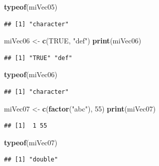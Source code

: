 \documentclass[]{book}
\newenvironment{Shaded}{\begin{snugshade}}{\end{snugshade}}
\newcommand{\KeywordTok}[1]{\textcolor[rgb]{0.13,0.29,0.53}{\textbf{#1}}}
\newcommand{\DecValTok}[1]{\textcolor[rgb]{0.00,0.00,0.81}{#1}}
\newcommand{\StringTok}[1]{\textcolor[rgb]{0.31,0.60,0.02}{#1}}
\newcommand{\OtherTok}[1]{\textcolor[rgb]{0.56,0.35,0.01}{#1}}
\newcommand{\NormalTok}[1]{#1}
\begin{document}
\begin{Shaded}
\begin{Highlighting}[]
\KeywordTok{typeof}\NormalTok{(miVec05)}
\end{Highlighting}
\end{Shaded}

\begin{verbatim}
## [1] "character"
\end{verbatim}

\begin{Shaded}
\begin{Highlighting}[]
\NormalTok{miVec06 <-}\StringTok{ }\KeywordTok{c}\NormalTok{(}\OtherTok{TRUE}\NormalTok{, }\StringTok{"def"}\NormalTok{)}
\KeywordTok{print}\NormalTok{(miVec06)}
\end{Highlighting}
\end{Shaded}

\begin{verbatim}
## [1] "TRUE" "def"
\end{verbatim}

\begin{Shaded}
\begin{Highlighting}[]
\KeywordTok{typeof}\NormalTok{(miVec06)}
\end{Highlighting}
\end{Shaded}

\begin{verbatim}
## [1] "character"
\end{verbatim}

\begin{Shaded}
\begin{Highlighting}[]
\NormalTok{miVec07 <-}\StringTok{ }\KeywordTok{c}\NormalTok{(}\KeywordTok{factor}\NormalTok{(}\StringTok{"abc"}\NormalTok{), }\DecValTok{55}\NormalTok{)}
\KeywordTok{print}\NormalTok{(miVec07)}
\end{Highlighting}
\end{Shaded}

\begin{verbatim}
## [1]  1 55
\end{verbatim}

\begin{Shaded}
\begin{Highlighting}[]
\KeywordTok{typeof}\NormalTok{(miVec07)}
\end{Highlighting}
\end{Shaded}

\begin{verbatim}
## [1] "double"
\end{verbatim}
\end{document}
